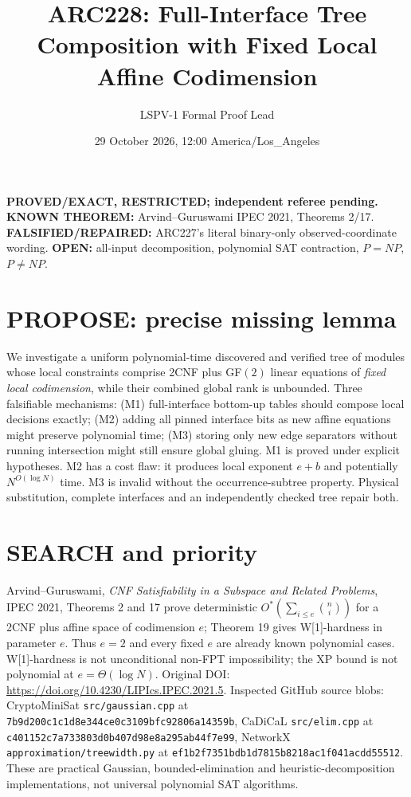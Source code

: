 \documentclass[11pt]{article}
\title{ARC228: Full-Interface Tree Composition with Fixed Local Affine Codimension}
\author{LSPV-1 Formal Proof Lead}
\date{29 October 2026, 12:00 America/Los\_Angeles}
\begin{document}
\maketitle
\noindent\textbf{PROVED/EXACT, RESTRICTED; independent referee pending.}
\textbf{KNOWN THEOREM:} Arvind--Guruswami IPEC 2021, Theorems 2/17.
\textbf{FALSIFIED/REPAIRED:} ARC227's literal binary-only observed-coordinate wording.
\textbf{OPEN:} all-input decomposition, polynomial SAT contraction, $P=NP$, $P\ne NP$.

\section{PROPOSE: precise missing lemma}
We investigate a uniform polynomial-time discovered and verified tree of modules
whose local constraints comprise 2CNF plus GF$(2)$ linear equations of
\emph{fixed local codimension}, while their combined global rank is unbounded.
Three falsifiable mechanisms: (M1) full-interface bottom-up tables should
compose local decisions exactly; (M2) adding all pinned interface bits as
new affine equations might preserve polynomial time; (M3) storing only new
edge separators without running intersection might still ensure global gluing.
M1 is proved under explicit hypotheses. M2 has a cost flaw: it produces
local exponent $e+b$ and potentially $N^{O(\log N)}$ time. M3 is invalid
without the occurrence-subtree property. Physical substitution, complete
interfaces and an independently checked tree repair both.

\section{SEARCH and priority}
Arvind--Guruswami, \emph{CNF Satisfiability in a Subspace and Related
Problems}, IPEC 2021, Theorems 2 and 17 prove deterministic
$O^*(\sum_{i\le e}\binom{n}{i})$ for a 2CNF plus affine space of
codimension $e$; Theorem 19 gives W[1]-hardness in parameter $e$.
Thus $e=2$ and every fixed $e$ are already known polynomial cases.
W[1]-hardness is not unconditional non-FPT impossibility; the XP bound
is not polynomial at $e=\Theta(\log N)$.
Original DOI: \url{https://doi.org/10.4230/LIPIcs.IPEC.2021.5}.
Inspected GitHub source blobs: CryptoMiniSat
\texttt{src/gaussian.cpp} at
\texttt{7b9d200c1c1d8e344ce0c3109bfc92806a14359b},
CaDiCaL \texttt{src/elim.cpp} at
\texttt{c401152c7a733803d0b407d98e8a295ab44f7e99},
NetworkX \texttt{approximation/treewidth.py} at
\texttt{ef1b2f7351bdb1d7815b8218ac1f041acdd55512}.
These are practical Gaussian, bounded-elimination and heuristic-decomposition
implementations, not universal polynomial SAT algorithms.
\end{document}
